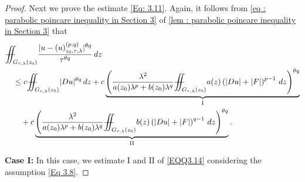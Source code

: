 \documentclass[11pt,oneside, english,reqno,twoside a4paper]{amsart}
\theoremstyle{definition}
\numberwithin{theorem}{section}
\numberwithin{equation}{section}
\newcommand{\iintss}{{\int\hspace{-0.28cm}\int}}
\newcommand{ \miints }{{\iintss\hspace{-0.56cm} -\hspace{-0.15cm}-}}
\newcommand{\miint}[1]{{\miints_{\hspace{-0.13cm}#1}}}
\begin{document}
\begin{proof}
Next we prove the estimate \eqref{Eq: 3.11}. Again, it follows from \eqref{eq : parabolic poincare inequality in Section 3} of \cref{lem : parabolic poincare inequality in Section 3} that
\begin{align}\label{EQQ3.14}
&\miint{G_{\tau, \lambda}(z_0)}\frac{|u-(u)^{(p,q)}_{z_0, \tau, \lambda}|^{\theta q}}{\tau^{\theta q}}\,dz\nonumber\\
&\quad \leq c\miint{G_{\tau, \lambda}(z_0)}|Du|^{\theta q}\, dz+ c\underbrace{\left(\frac{\lambda^2}{a(z_0)\lambda^p+b(z_0)\lambda^q}\miint{G_{\tau, \lambda}(z_0)}a(z)\left(|Du|+|F|\right)^{p-1}\,dz\right)^{\theta q}}_{\mathrm{I}}\nonumber\\
&\qquad +c\underbrace{\left(\frac{\lambda^2}{a(z_0)\lambda^p+b(z_0)\lambda^q}\miint{G_{\tau, \lambda}(z_0)}b(z)\left(|Du|+|F|\right)^{q-1}\,dz\right)^{\theta q}}_{\mathrm{II}}.
\end{align}

\noindent \textbf{Case I:} In this case, we estimate $\mathrm{I}$ and $\mathrm{II}$ of \eqref{EQQ3.14} considering the assumption \eqref{Eq 3.8}.


\end{proof}
\end{document}
